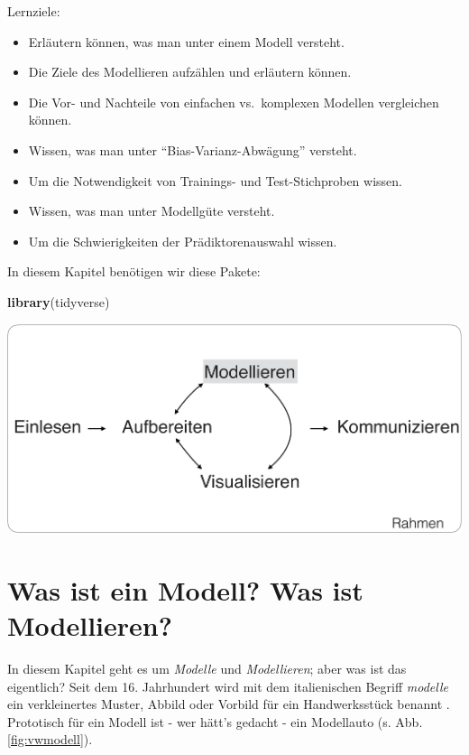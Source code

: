 \documentclass[12pt,ngerman,]{book}
\newenvironment{Shaded}{\begin{snugshade}}{\end{snugshade}}
\newcommand{\KeywordTok}[1]{\textcolor[rgb]{0.13,0.29,0.53}{\textbf{{#1}}}}
\newcommand{\NormalTok}[1]{{#1}}
\providecommand{\tightlist}{%
  \setlength{\itemsep}{0pt}\setlength{\parskip}{0pt}}
\renewenvironment{Shaded}{\begin{kframe}}{\end{kframe}}
\let\BeginKnitrBlock\begin \let\EndKnitrBlock\end
\begin{document}
\BeginKnitrBlock{rmdcaution}
Lernziele:

\begin{itemize}
\tightlist
\item
  Erläutern können, was man unter einem Modell versteht.
\item
  Die Ziele des Modellieren aufzählen und erläutern können.
\item
  Die Vor- und Nachteile von einfachen vs.~komplexen Modellen
  vergleichen können.
\item
  Wissen, was man unter ``Bias-Varianz-Abwägung'' versteht.
\item
  Um die Notwendigkeit von Trainings- und Test-Stichproben wissen.
\item
  Wissen, was man unter Modellgüte versteht.
\item
  Um die Schwierigkeiten der Prädiktorenauswahl wissen.
\end{itemize}
\EndKnitrBlock{rmdcaution}

In diesem Kapitel benötigen wir diese Pakete:

\begin{Shaded}
\begin{Highlighting}[]
\KeywordTok{library}\NormalTok{(tidyverse)}
\end{Highlighting}
\end{Shaded}

\begin{center}\includegraphics[width=0.7\linewidth]{images/Modellieren} \end{center}

\section{Was ist ein Modell? Was ist Modellieren?}\label{Modellieren}

In diesem Kapitel geht es um \emph{Modelle} und \emph{Modellieren}; aber
was ist das eigentlich? Seit dem 16. Jahrhundert wird mit dem
italienischen Begriff \emph{modelle} ein verkleinertes Muster, Abbild
oder Vorbild für ein Handwerksstück benannt \citep{gigerenzer1980}.
Prototisch für ein Modell ist - wer hätt's gedacht - ein Modellauto (s.
Abb. \ref{fig:vwmodell}).
\end{document}
